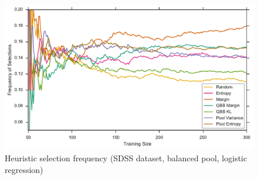 \begin{figure}[p]
	\centering
	\includegraphics[width=\textwidth]{figures/5_thompson/sdss_bl_frequencies}
	\caption[Heuristic selection frequency (SDSS, balanced, logistic)]{
		Heuristic selection frequency (SDSS dataset, balanced pool, logistic regression)}
	\label{fig:sdss_bl_frequencies}
\end{figure}

